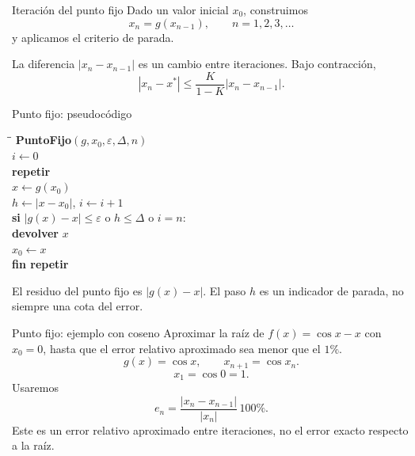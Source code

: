 \documentclass[main.tex]{subfiles}
\begin{document}
\begin{frame}{Iteración del punto fijo}
Dado un valor inicial $x_0$, construimos\[\boxed{x_n=g(x_{n-1}),\qquad n=1,2,3,\ldots}\]y aplicamos el criterio de parada.\par\medskip La diferencia $|x_n-x_{n-1}|$ es un cambio entre iteraciones. Bajo contracción,\[|x_n-x^*|\le\frac{K}{1-K}|x_n-x_{n-1}|.\]
\end{frame}

\begin{frame}{Punto fijo: pseudocódigo}
\footnotesize\begin{tabbing}\hspace{4mm}\=\hspace{5mm}\=\kill
\textbf{PuntoFijo}$(g,x_0,\varepsilon,\Delta,n)$\\
$i\gets0$\\
\textbf{repetir}\\
\>$x\gets g(x_0)$\\
\>$h\gets|x-x_0|$, $i\gets i+1$\\
\>\textbf{si} $|g(x)-x|\le\varepsilon$ o $h\le\Delta$ o $i=n$:\\
\>\>\textbf{devolver} $x$\\
\>$x_0\gets x$\\
\textbf{fin repetir}
\end{tabbing}\medskip El residuo del punto fijo es $|g(x)-x|$. El paso $h$ es un indicador de parada, no siempre una cota del error.
\end{frame}

\begin{frame}{Punto fijo: ejemplo con coseno}
\small Aproximar la raíz de $f(x)=\cos x-x$ con $x_0=0$, hasta que el error relativo aproximado sea menor que el $1\%$.\[g(x)=\cos x,\qquad x_{n+1}=\cos x_n.\]\[x_1=\cos0=1.\]Usaremos\[e_n=\frac{|x_n-x_{n-1}|}{|x_n|}\,100\%.\]Este es un error relativo aproximado entre iteraciones, no el error exacto respecto a la raíz.
\end{frame}
\end{document}

